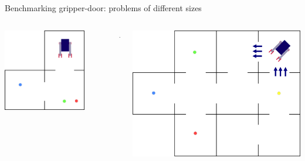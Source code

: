\begin{frame}[c, fragile]{Benchmarking gripper-door: problems of different sizes}
    \begin{columns}[c]
        \begin{column}[c]{0.3\textwidth}
            \includegraphics[width = 0.8\textwidth]{images/3_rooms/gd_3_0.png}
        \end{column}
        \begin{column}{0.1\textwidth}
            \centering $\rightarrow$
        \end{column}
        \begin{column}[c]{0.5\textwidth}
            \includegraphics[width = \textwidth, angle=90]{images/11_rooms/gd_11_0.png}
        \end{column}
    \end{columns}
\end{frame}

